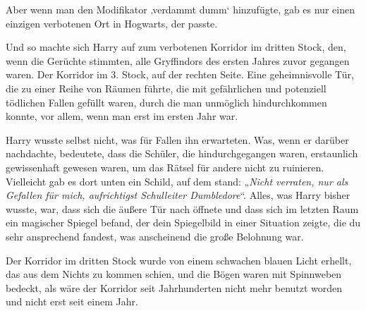 Aber wenn man den Modifikator ‚verdammt dumm‘ hinzufügte, gab es nur einen einzigen verbotenen Ort in Hogwarts, der passte.

Und so machte sich Harry auf zum verbotenen Korridor im dritten Stock, den, wenn die Gerüchte stimmten, alle Gryffindors des ersten Jahres zuvor gegangen waren. Der Korridor im 3. Stock, auf der rechten Seite. Eine geheimnisvolle Tür, die zu einer Reihe von Räumen führte, die mit gefährlichen und potenziell tödlichen Fallen gefüllt waren, durch die man unmöglich hindurchkommen konnte, vor allem, wenn man erst im ersten Jahr war.

Harry wusste selbst nicht, was für Fallen ihn erwarteten. Was, wenn er darüber nachdachte, bedeutete, dass die Schüler, die hindurchgegangen waren, erstaunlich gewissenhaft gewesen waren, um das Rätsel für andere nicht zu ruinieren. Vielleicht gab es dort unten ein Schild, auf dem stand:
„\emph{Nicht verraten, nur als Gefallen für mich, aufrichtigst Schulleiter Dumbledore}“. Alles, was Harry bisher wusste, war, dass sich die äußere Tür nach  öffnete und dass sich im letzten Raum ein magischer Spiegel befand, der dein Spiegelbild in einer Situation zeigte, die du sehr ansprechend fandest, was anscheinend die große Belohnung war.

Der Korridor im dritten Stock wurde von einem schwachen blauen Licht erhellt, das aus dem Nichts zu kommen schien, und die Bögen waren mit Spinnweben bedeckt, als wäre der Korridor seit Jahrhunderten nicht mehr benutzt worden und nicht erst seit einem Jahr.


